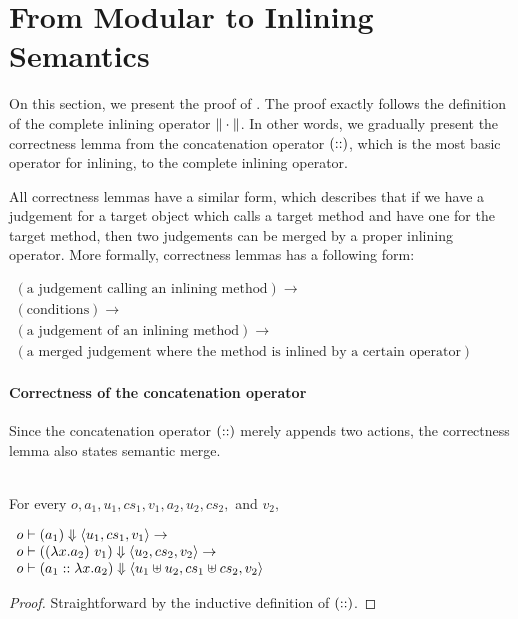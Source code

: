 \section{From Modular to Inlining Semantics}

On this section, we present the proof of . The
proof exactly follows the definition of the complete inlining operator
$\| \cdot \|$. In other words, we gradually present the
correctness lemma from the concatenation operator $(::)$,
which is the most basic operator for inlining, to the complete
inlining operator.

All correctness lemmas have a similar form, which describes that if we
have a judgement for a target object which calls a target method and
have one for the target method, then two judgements can be merged by a
proper inlining operator. More formally, correctness lemmas has a
following form:
\begin{center}
  \begin{math}
    \begin{array}{l}
      (\textrm{a judgement calling an inlining method}) \to \\
      (\textrm{conditions}) \to \\
      (\textrm{a judgement of an inlining method}) \to \\
      (\textrm{a merged judgement where the method is inlined by a certain operator})
    \end{array}
  \end{math}
\end{center}

\paragraph{Correctness of the concatenation operator}

Since the concatenation operator $(::)$ merely appends two
actions, the correctness lemma also states semantic merge.

\begin{lemma}
  \label{lem-concatsymb}
  \mbox{}\\
  For every $o, a_1, u_1, cs_1, v_1, a_2, u_2, cs_2,$ and $v_2,$
  \begin{center}
    \begin{math}
      \begin{array}{l}
        o |- (a_1) \Downarrow \langle u_1, cs_1, v_1 \rangle \to \\
        o |- ((\lambda x.a_2)\ v_1) \Downarrow \langle u_2, cs_2, v_2 \rangle \to \\
        o |- (a_1 ::{} \lambda x.a_2) \Downarrow \langle u_1 \uplus u_2, cs_1 \uplus cs_2, v_2 \rangle
      \end{array}
    \end{math}
  \end{center}
\end{lemma}
\begin{proof}
  Straightforward by the inductive definition of $(::)$.
\end{proof}

